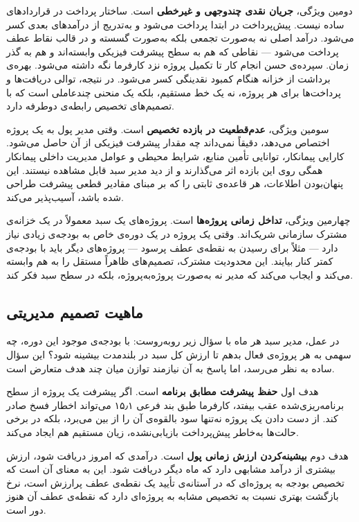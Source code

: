 دومین ویژگی، \textbf{جریان نقدی چندوجهی و غیرخطی} است. ساختار پرداخت
در قراردادهای  ساده نیست. پیش‌پرداخت در ابتدا پرداخت می‌شود
و به‌تدریج از درآمدهای بعدی کسر می‌شود. درآمد اصلی نه به‌صورت تجمعی
بلکه به‌صورت گسسته و در قالب نقاط عطف پرداخت می‌شود — نقاطی که هم به
سطح پیشرفت فیزیکی وابسته‌اند و هم به گذر زمان. سپرده‌ی حسن انجام کار
تا تکمیل پروژه نزد کارفرما نگه داشته می‌شود. بهره‌ی برداشت از خزانه
هنگام کمبود نقدینگی کسر می‌شود. در نتیجه، توالی دریافت‌ها و
پرداخت‌ها برای هر پروژه، نه یک خط مستقیم، بلکه یک منحنی چندعاملی است
که با تصمیم‌های تخصیص رابطه‌ی دوطرفه دارد.

سومین ویژگی، \textbf{عدم‌قطعیت در بازده تخصیص} است. وقتی مدیر پول به
یک پروژه اختصاص می‌دهد، دقیقاً نمی‌داند چه مقدار پیشرفت فیزیکی از آن
حاصل می‌شود. کارایی پیمانکار، توانایی تأمین منابع، شرایط محیطی و
عوامل مدیریت داخلی پیمانکار همگی روی این بازده اثر می‌گذارند و از دید
مدیر سبد قابل مشاهده نیستند. این پنهان‌بودن اطلاعات، هر قاعده‌ی ثابتی
را که بر مبنای مقادیر قطعی پیشرفت طراحی شده باشد، آسیب‌پذیر می‌کند.

چهارمین ویژگی، \textbf{تداخل زمانی پروژه‌ها} است. پروژه‌های یک سبد
معمولاً در یک خزانه‌ی مشترک سازمانی شریک‌اند. وقتی یک پروژه در یک
دوره‌ی خاص به بودجه‌ی زیادی نیاز دارد — مثلاً برای رسیدن به نقطه‌ی
عطف پرسود — پروژه‌های دیگر باید با بودجه‌ی کمتر کنار بیایند. این
محدودیت مشترک، تصمیم‌های ظاهراً مستقل را به هم وابسته می‌کند و ایجاب
می‌کند که مدیر نه به‌صورت پروژه‌به‌پروژه، بلکه در سطح سبد فکر کند.

\subsection{ماهیت تصمیم مدیریتی}

در عمل، مدیر سبد هر ماه با سؤال زیر روبه‌روست: با بودجه‌ی موجود این
دوره، چه سهمی به هر پروژه‌ی فعال بدهم تا ارزش کل سبد در بلندمدت بیشینه
شود؟ این سؤال ساده به نظر می‌رسد، اما پاسخ به آن نیازمند توازن میان
چند هدف متعارض است.

هدف اول \textbf{حفظ پیشرفت مطابق برنامه} است. اگر پیشرفت یک پروژه
از سطح برنامه‌ریزی‌شده عقب بیفتد، کارفرما طبق بند فرعی ۱۵٫۱
 می‌تواند اخطار فسخ صادر کند. از دست دادن یک پروژه نه‌تنها
سود بالقوه‌ی آن را از بین می‌برد، بلکه در برخی حالت‌ها به‌خاطر
پیش‌پرداخت بازیابی‌نشده، زیان مستقیم هم ایجاد می‌کند.

هدف دوم \textbf{بیشینه‌کردن ارزش زمانی پول} است. درآمدی که امروز
دریافت شود، ارزش بیشتری از درآمد مشابهی دارد که ماه دیگر دریافت
شود. این به معنای آن است که تخصیص بودجه به پروژه‌ای که در آستانه‌ی
تأیید یک نقطه‌ی عطف پرارزش است، نرخ بازگشت بهتری نسبت به تخصیص
مشابه به پروژه‌ای دارد که نقطه‌ی عطف آن هنوز دور است.

